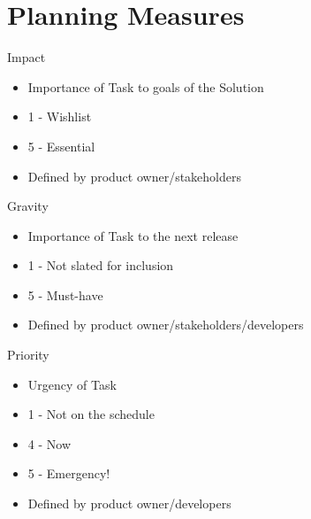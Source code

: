 \documentclass[aspectratio=169]{beamer}
\begin{document}
\section{Planning Measures}
\begin{frame}{Impact}
    \begin{itemize}
        \item Importance of Task to goals of the Solution
        \item 1 - Wishlist
        \item 5 - Essential
        \item Defined by product owner/stakeholders
    \end{itemize}
\end{frame}
\begin{frame}{Gravity}
    \begin{itemize}
        \item Importance of Task to the next release
        \item 1 - Not slated for inclusion
        \item 5 - Must-have
        \item Defined by product owner/stakeholders/developers
    \end{itemize}
\end{frame}
\begin{frame}{Priority}
    \begin{itemize}
        \item Urgency of Task
        \item 1 - Not on the schedule
        \item 4 - Now
        \item 5 - Emergency!
        \item Defined by product owner/developers
    \end{itemize}
\end{frame}
\end{document}
